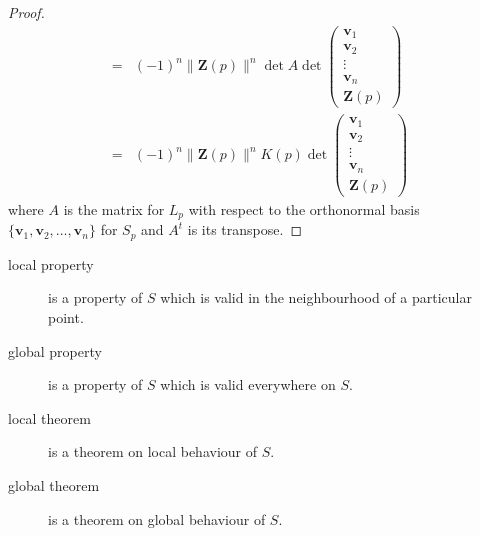\begin{proof}
\begin{align*}
	= & (-1)^n \| \mathbf{Z}(p) \|^n \det A \det \begin{pmatrix} \mathbf{v}_1 \\ \mathbf{v}_2 \\ \vdots \\ \mathbf{v}_n \\ \mathbf{Z}(p) \end{pmatrix} \\
	= & (-1)^n \| \mathbf{Z}(p) \|^n K(p) \det \begin{pmatrix} \mathbf{v}_1 \\ \mathbf{v}_2 \\ \vdots \\ \mathbf{v}_n \\ \mathbf{Z}(p) \end{pmatrix} 
	\end{align*}
	where $A$ is the matrix for $L_p$ with respect to the orthonormal basis $\{ \mathbf{v}_1, \mathbf{v}_2, \dots, \mathbf{v}_n\}$ for $S_p$ and $A^t$ is its transpose.
\endgroup
\end{proof}

\begin{description}
	\item[local property] is a property of $S$ which is valid in the neighbourhood of a particular point.
	\item[global property] is a property of $S$ which is valid everywhere on $S$.
	\item[local theorem] is a theorem on local behaviour of $S$.
	\item[global theorem] is a theorem on global behaviour of $S$.
\end{description}

